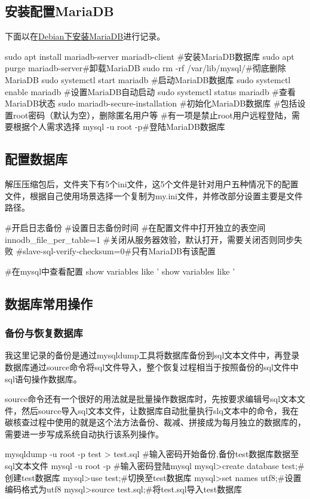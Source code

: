 \subsection{安装配置MariaDB}
下面以在\href{https://blog.csdn.net/erliujian111/article/details/135732876?spm=1001.2014.3001.5506}{Debian下安装MariaDB}进行记录。
\begin{shell}
sudo apt install mariadb-server mariadb-client
#安装MariaDB数据库
sudo apt purge mariadb-server#卸载MariaDB
sudo rm -rf /var/lib/mysql/#彻底删除MariaDB
sudo systemctl start mariadb #启动MariaDB数据库
sudo systemctl enable mariadb #设置MariaDB自动启动
sudo systemctl status mariadb #查看MariaDB状态
sudo mariadb-secure-installation #初始化MariaDB数据库
#包括设置root密码（默认为空），删除匿名用户等
#有一项是禁止root用户远程登陆，需要根据个人需求选择
mysql -u root -p#登陆MariaDB数据库
\end{shell}
\subsection{配置数据库}
解压压缩包后，文件夹下有5个ini文件，这5个文件是针对用户五种情况下的配置文件，根据自己使用场景选择一个复制为my.ini文件，并修改部分设置主要是文件路径。
\begin{shell}
#开启日志备份
#设置日志备份时间
#在配置文件中打开独立的表空间
innodb_file_per_table=1
#关闭从服务器效验，默认打开，需要关闭否则同步失败
#slave-sql-verify-checksum=0#只有MariaDB有该配置

#在mysql中查看配置
show variables like '%
show variables like '%
\end{shell}
\subsection{数据库常用操作}
\subsubsection{备份与恢复数据库}
我这里记录的备份是通过mysqldump工具将数据库备份到sql文本文件中，再登录数据库通过source命令将sql文件导入，整个恢复过程相当于按照备份的sql文件中sql语句操作数据库。

source命令还有一个很好的用法就是批量操作数据库时，先按要求编辑号sql文本文件，然后source导入sql文本文件，让数据库自动批量执行slq文本中的命令，我在碳核查过程中使用的就是这个法方法备份、裁减、拼接成为每月独立的数据库的，需要进一步写成系统自动执行该系列操作。
\begin{shell}
mysqldump -u root -p test > test.sql
#输入密码开始备份,备份test数据库数据至sql文本文件
mysql -u root -p
#输入密码登陆mysql
mysql>create database test;#创建test数据库
mysql>use test;#切换至test数据库
mysql>set names utf8;#设置编码格式为utf8
mysql>source test.sql;#将test.sql导入test数据库
\end{shell}
